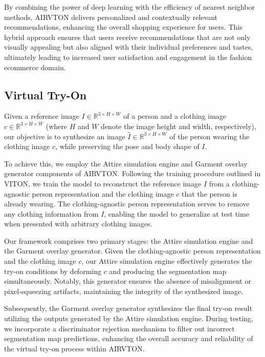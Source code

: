     By combining the power of deep learning with the efficiency of nearest neighbor methods, AIRVTON delivers personalized and contextually relevant recommendations, enhancing the overall shopping experience for users. This hybrid approach ensures that users receive recommendations that are not only visually appealing but also aligned with their individual preferences and tastes, ultimately leading to increased user satisfaction and engagement in the fashion ecommerce domain.

    
    \subsection{Virtual Try-On}
    Given a reference image \( I \in \mathbb{R}^{3 \times H \times W} \) of a person and a clothing image \( c \in \mathbb{R}^{3 \times H \times W} \) (where \( H \) and \( W \) denote the image height and width, respectively), our objective is to synthesize an image \( \hat{I} \in \mathbb{R}^{3 \times H \times W} \) of the person wearing the clothing image \( c \), while preserving the pose and body shape of \( I \).

    To achieve this, we employ the Attire simulation engine and Garment overlay generator components of AIRVTON. Following the training procedure outlined in VITON, we train the model to reconstruct the reference image \( I \) from a clothing-agnostic person representation and the clothing image \( c \) that the person is already wearing. The clothing-agnostic person representation serves to remove any clothing information from \( I \), enabling the model to generalize at test time when presented with arbitrary clothing images.

    Our framework comprises two primary stages: the Attire simulation engine and the Garment overlay generator. Given the clothing-agnostic person representation and the clothing image \( c \), our Attire simulation engine effectively generates the try-on conditions by deforming \( c \) and producing the segmentation map simultaneously. Notably, this generator ensures the absence of misalignment or pixel-squeezing artifacts, maintaining the integrity of the synthesized image.

    Subsequently, the Garment overlay generator synthesizes the final try-on result utilizing the outputs generated by the Attire simulation engine. During testing, we incorporate a discriminator rejection mechanism to filter out incorrect segmentation map predictions, enhancing the overall accuracy and reliability of the virtual try-on process within AIRVTON.

